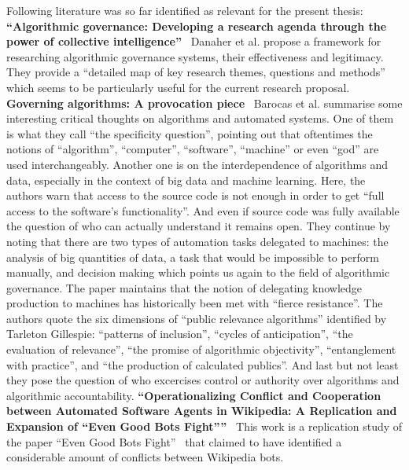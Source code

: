 \documentclass[pdftex,a4paper,11pt]{scrartcl}
\begin{document}
Following literature was so far identified as relevant for the present thesis:
\newline
\newline
\textbf{``Algorithmic governance: Developing a research agenda through the power of collective intelligence''}~\cite{DanaherEtAl2017}
\newline
\newline
Danaher et al. propose a framework for researching algorithmic governance systems, their effectiveness and legitimacy.
They provide a ``detailed map of key research themes, questions and methods'' which seems to be particularly useful for the current research proposal.
\newline
\newline
\textbf{Governing algorithms: A provocation piece}~\cite{BarHooZie2013}
\newline
\newline
Barocas et al. summarise some interesting critical thoughts on algorithms and automated systems.
One of them is what they call ``the specificity question'', pointing out that oftentimes the notions of ``algorithm'', ``computer'', ``software'', ``machine'' or even ``god'' are used interchangeably.
Another one is on the interdependence of algorithms and data, especially in the context of big data and machine learning.
Here, the authors warn that access to the source code is not enough in order to get ``full access to the software's functionality''.
And even if source code was fully available the question of who can actually understand it remains open.
They continue by noting that there are two types of automation tasks delegated to machines: the analysis of big quantities of data, a task that would be impossible to perform manually, and decision making which points us again to the field of algorithmic governance.
The paper maintains that the notion of delegating knowledge production to machines has historically been met with ``fierce resistance''.
The authors quote the six dimensions of ``public relevance algorithms'' identified by Tarleton Gillespie:
``patterns of inclusion'',
``cycles of anticipation'',
``the evaluation of relevance'',
``the promise of algorithmic objectivity'',
``entanglement with practice'',
and ``the production of calculated publics''.
And last but not least they pose the question of who excercises control or authority over algorithms and algorithmic accountability.
\newline
\newline
\textbf{``Operationalizing Conflict and Cooperation between Automated Software Agents in Wikipedia: A Replication and Expansion of “Even Good Bots Fight”''}~\cite{GeiHal2017}
\newline
\newline
This work is a replication study of the paper ``Even Good Bots Fight''~\cite{TsvetkovaEtAl2017} that claimed to have identified a considerable amount of conflicts between Wikipedia bots.
\end{document}
